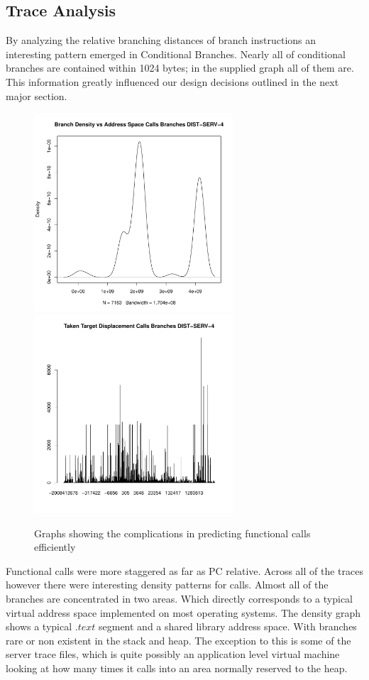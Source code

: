 \subsection{Trace Analysis}
By analyzing the relative branching distances of branch instructions an interesting pattern emerged in Conditional Branches. Nearly all of conditional branches are contained within 1024 bytes; in the supplied graph all of them are. This information greatly influenced our design decisions outlined in the next major section.
\begin{figure}
\begin{center} 
\includegraphics[width=7.4cm]{"./Calls Branches DIST-SERV-4-density"}
\includegraphics[width=7.4cm]{"./Calls Branches DIST-SERV-4-histogram"}
\caption{Graphs showing the complications in predicting functional calls efficiently}
\end{center}
\end{figure}
Functional calls were more staggered as far as PC relative. Across all of the traces however there were interesting density patterns for calls. Almost all of the branches are concentrated in two areas. Which directly corresponds to a typical virtual address space implemented on most operating systems. The density graph shows a typical $.text$ segment and a shared library address space. With branches rare or non existent in the stack and heap. The exception to this is some of the server trace files, which is quite possibly an application level virtual machine looking at how many times it calls into an area normally reserved to the heap.

